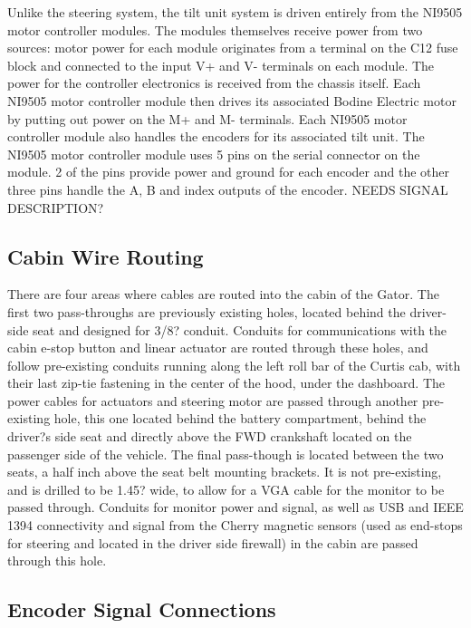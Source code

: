 \noindent Unlike the steering system, the tilt unit system is driven entirely from the NI9505 motor controller modules. The modules themselves receive power from two sources: motor power for each module originates from a terminal on the C12 fuse block and connected to the input V+ and V- terminals on each module. The power for the controller electronics is received from the chassis itself. Each NI9505 motor controller module then drives its associated Bodine Electric motor by putting out power on the M+ and M- terminals. Each NI9505 motor controller module also handles the encoders for its associated tilt unit. The NI9505 motor controller module uses 5 pins on the serial connector on the module. 2 of the pins provide power and ground for each encoder and the other three pins handle the A, B and index outputs of the encoder. NEEDS SIGNAL DESCRIPTION?

\subsection{Cabin Wire Routing}

There are four areas where cables are routed into the cabin of the Gator. The first two pass-throughs are previously existing holes, located behind the driver-side seat and designed for 3/8? conduit. Conduits for communications with the cabin e-stop button and linear actuator are routed through these holes, and follow pre-existing conduits running along the left roll bar of the Curtis cab, with their last zip-tie fastening in the center of the hood, under the dashboard. The power cables for actuators and steering motor are passed through another pre-existing hole, this one located behind the battery compartment, behind the driver?s side seat and directly above the FWD crankshaft located on the passenger side of the vehicle. The final pass-though is located between the two seats, a half inch above the seat belt mounting brackets. It is not pre-existing, and is drilled to be 1.45? wide, to allow for a VGA cable for the monitor to be passed through. Conduits for monitor power and signal, as well as USB and IEEE 1394 connectivity and signal from the Cherry magnetic sensors (used as end-stops for steering and located in the driver side firewall) in the cabin are passed through this hole.

\newpage

\subsection{Encoder Signal Connections}

